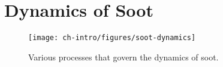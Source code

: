 \section{Dynamics of Soot}
\label{sec:intro:dynamics}




\begin{figure}[htb]
  \centering
  \texttt{[image: ch-intro/figures/soot-dynamics]}
  \caption[Dynamics of Soot]{Various processes that govern the dynamics of soot.}
  \label{fig:intro:dynamics:sootdynamics}
\end{figure}
